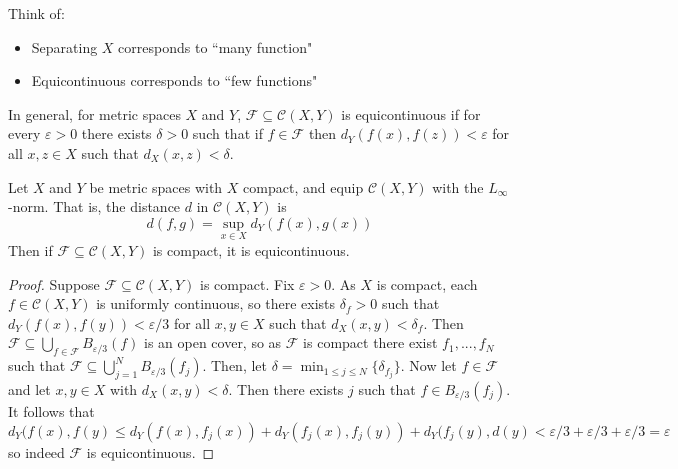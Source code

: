 \begin{rmk}
    Think of: \begin{itemize}
        \item Separating $X$ corresponds to ``many function"
        \item Equicontinuous corresponds to ``few functions"
    \end{itemize}
\end{rmk}

\begin{defn}
    In general, for metric spaces $X$ and $Y$, $\mathcal{F} \subseteq \mathcal{C}(X,Y)$ is equicontinuous if for every $\varepsilon > 0$ there exists $\delta > 0$ such that if $f \in \mathcal{F}$ then $d_Y(f(x),f(z)) < \varepsilon$ for all $x,z \in X$ such that $d_X(x,z) < \delta$.
\end{defn}

\begin{prop}
    Let $X$ and $Y$ be metric spaces with $X$ compact, and equip $\mathcal{C}(X,Y)$ with the $L_{\infty}$-norm. That is, the distance $d$ in $\mathcal{C}(X,Y)$ is $$d(f,g) = \sup_{x\in X}d_Y(f(x),g(x))$$ Then if $\mathcal{F}\subseteq \mathcal{C}(X,Y)$ is compact, it is equicontinuous.
\end{prop}
\begin{proof}
    Suppose $\mathcal{F} \subseteq \mathcal{C}(X,Y)$ is compact. Fix $\varepsilon > 0$. As $X$ is compact, each $f \in \mathcal{C}(X,Y)$ is uniformly continuous, so there exists $\delta_f > 0$ such that $d_Y(f(x),f(y)) < \varepsilon/3$ for all $x,y \in X$ such that $d_X(x,y) < \delta_f$. Then $\mathcal{F} \subseteq \bigcup_{f \in \mathcal{F}}B_{\varepsilon/3}(f)$ is an open cover, so as $\mathcal{F}$ is compact there exist $f_1,...,f_N$ such that $\mathcal{F} \subseteq \bigcup_{j=1}^NB_{\varepsilon/3}(f_j)$. Then, let $\delta = \min_{1\leq j \leq N}\{\delta_{f_j}\}$. Now let $f \in \mathcal{F}$ and let $x,y \in X$ with $d_X(x,y) < \delta$. Then there exists $j$ such that $f \in B_{\varepsilon/3}(f_j)$. It follows that $$d_Y(f(x),f(y) \leq d_Y(f(x),f_j(x))+d_Y(f_j(x),f_j(y)) + d_Y(f_j(y),d(y) < \varepsilon/3 + \varepsilon/3+\varepsilon/3 = \varepsilon$$ so indeed $\mathcal{F}$ is equicontinuous.
\end{proof}

